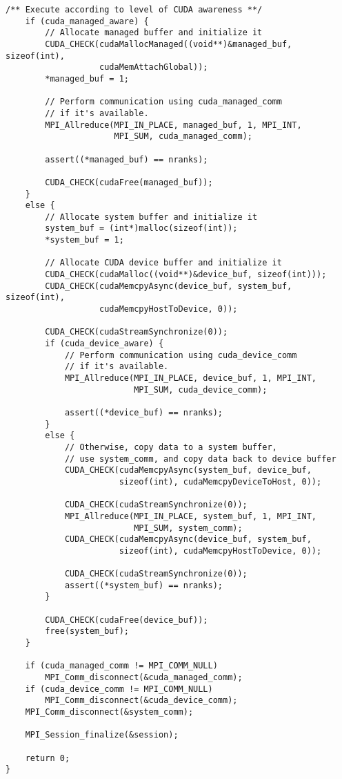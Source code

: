 \begin{example}
\begin{lstlisting}[language={[MPI]C}]
    /** Execute according to level of CUDA awareness **/
    if (cuda_managed_aware) {
        // Allocate managed buffer and initialize it
        CUDA_CHECK(cudaMallocManaged((void**)&managed_buf, sizeof(int),
                   cudaMemAttachGlobal));
        *managed_buf = 1;

        // Perform communication using cuda_managed_comm
        // if it's available.
        MPI_Allreduce(MPI_IN_PLACE, managed_buf, 1, MPI_INT,
                      MPI_SUM, cuda_managed_comm);

        assert((*managed_buf) == nranks);

        CUDA_CHECK(cudaFree(managed_buf));
    }
    else {
        // Allocate system buffer and initialize it
        system_buf = (int*)malloc(sizeof(int));
        *system_buf = 1;

        // Allocate CUDA device buffer and initialize it
        CUDA_CHECK(cudaMalloc((void**)&device_buf, sizeof(int)));
        CUDA_CHECK(cudaMemcpyAsync(device_buf, system_buf, sizeof(int),
                   cudaMemcpyHostToDevice, 0));

        CUDA_CHECK(cudaStreamSynchronize(0));
        if (cuda_device_aware) {
            // Perform communication using cuda_device_comm
            // if it's available.
            MPI_Allreduce(MPI_IN_PLACE, device_buf, 1, MPI_INT,
                          MPI_SUM, cuda_device_comm);

            assert((*device_buf) == nranks);
        }
        else {
            // Otherwise, copy data to a system buffer,
            // use system_comm, and copy data back to device buffer
            CUDA_CHECK(cudaMemcpyAsync(system_buf, device_buf,
                       sizeof(int), cudaMemcpyDeviceToHost, 0));

            CUDA_CHECK(cudaStreamSynchronize(0));
            MPI_Allreduce(MPI_IN_PLACE, system_buf, 1, MPI_INT,
                          MPI_SUM, system_comm);
            CUDA_CHECK(cudaMemcpyAsync(device_buf, system_buf,
                       sizeof(int), cudaMemcpyHostToDevice, 0));

            CUDA_CHECK(cudaStreamSynchronize(0));
            assert((*system_buf) == nranks);
        }

        CUDA_CHECK(cudaFree(device_buf));
        free(system_buf);
    }

    if (cuda_managed_comm != MPI_COMM_NULL)
        MPI_Comm_disconnect(&cuda_managed_comm);
    if (cuda_device_comm != MPI_COMM_NULL)
        MPI_Comm_disconnect(&cuda_device_comm);
    MPI_Comm_disconnect(&system_comm);

    MPI_Session_finalize(&session);

    return 0;
}
\end{lstlisting}
\end{example}

